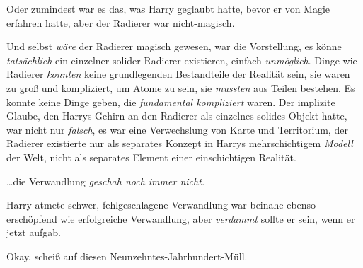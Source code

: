 Oder zumindest war es das, was Harry geglaubt hatte, bevor er von Magie erfahren hatte, aber der Radierer war nicht-magisch.

Und selbst \emph{wäre} der Radierer magisch gewesen, war die Vorstellung, es könne \emph{tatsächlich} ein einzelner solider Radierer existieren, einfach \emph{unmöglich}. Dinge wie Radierer \emph{konnten} keine grundlegenden Bestandteile der Realität sein, sie waren zu groß und kompliziert, um Atome zu sein, sie \emph{mussten} aus Teilen bestehen. Es konnte keine Dinge geben, die \emph{fundamental kompliziert} waren. Der implizite Glaube, den Harrys Gehirn an den Radierer als einzelnes solides Objekt hatte, war nicht nur \emph{falsch}, es war eine Verwechslung von Karte und Territorium, der Radierer existierte nur als separates Konzept in Harrys mehrschichtigem \emph{Modell} der Welt, nicht als separates Element einer einschichtigen Realität.

…die Verwandlung \emph{geschah noch immer nicht.}

Harry atmete schwer, fehlgeschlagene Verwandlung war beinahe ebenso erschöpfend wie erfolgreiche Verwandlung, aber \emph{verdammt} sollte er sein, wenn er jetzt aufgab.

Okay, scheiß auf diesen Neunzehntes-Jahrhundert-Müll.

